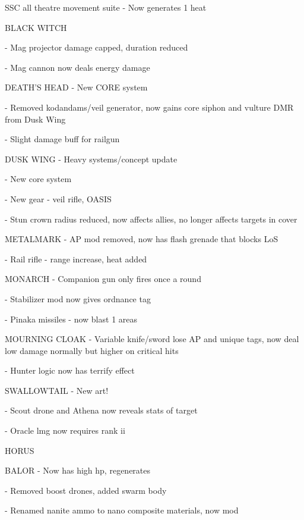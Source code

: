 SSC all theatre movement suite - Now generates 1 heat
 

BLACK WITCH 
 

                                                                                                                     


    -    Mag projector damage capped, duration reduced
 
    -    Mag cannon now deals energy damage
 

DEATH'S HEAD  
    -    New CORE system
 
    -    Removed kodandams/veil generator, now gains core siphon and vulture DMR from Dusk Wing
 

    -    Slight damage buff for railgun
 

DUSK WING   
    -    Heavy systems/concept update
 

    -    New core system
 
    -    New gear - veil rifle, OASIS
 

    -    Stun crown radius reduced, now affects allies, no longer affects targets in cover
 
METALMARK  
    -    AP mod removed, now has flash grenade that blocks LoS
 

    -    Rail rifle - range increase, heat added
 
MONARCH   
    -    Companion gun only fires once a round
 

    -    Stabilizer mod now gives ordnance tag
 
    -    Pinaka missiles - now blast 1 areas
 

MOURNING CLOAK   
    -    Variable knife/sword lose AP and unique tags, now deal low damage normally but higher on critical  
         hits
 
    -    Hunter logic now has terrify effect
 

SWALLOWTAIL  
    -    New art!
 
    -    Scout drone and Athena now reveals stats of target
 

    -    Oracle lmg now requires rank ii
 

                                                      HORUS  

BALOR   
    -    Now has high hp, regenerates
 

    -    Removed boost drones, added swarm body
 
    -    Renamed nanite ammo to nano composite materials, now mod
 

